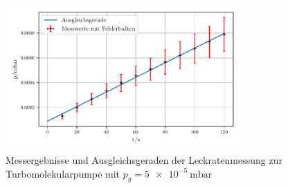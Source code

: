     \begin{figure}
        \centering
        \includegraphics[width=0.8\textwidth]{abb/turbo_leck5e-5.pdf}
        \caption{Messergebnisse und Ausgleichsgeraden der Leckratenmessung zur Turbomolekularpumpe mit $p_g = \qty{5e-5}{\milli\bar}$}
        \label{fig:turboLeck5}
    \end{figure}


